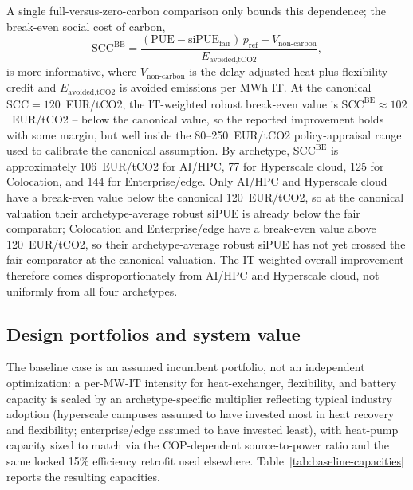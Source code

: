 \documentclass[preprint,12pt]{elsarticle}
\begin{document}
A single full-versus-zero-carbon comparison only bounds this dependence; the break-even social cost of carbon,
\begin{equation}
\text{SCC}^{\text{BE}} = \frac{(\text{PUE} - \text{siPUE}_{\text{fair}})\,p_{\text{ref}} - V_{\text{non-carbon}}}{E_{\text{avoided,tCO2}}},
\label{eq:scc-breakeven}
\end{equation}
is more informative, where $V_{\text{non-carbon}}$ is the delay-adjusted heat-plus-flexibility credit and $E_{\text{avoided,tCO2}}$ is avoided emissions per MWh IT. At the canonical $\text{SCC}=120$~EUR/tCO2, the IT-weighted robust break-even value is $\text{SCC}^{\text{BE}}\approx102$~EUR/tCO2 -- below the canonical value, so the reported improvement holds with some margin, but well inside the 80--250~EUR/tCO2 policy-appraisal range used to calibrate the canonical assumption. By archetype, $\text{SCC}^{\text{BE}}$ is approximately 106~EUR/tCO2 for AI/HPC, 77 for Hyperscale cloud, 125 for Colocation, and 144 for Enterprise/edge. Only AI/HPC and Hyperscale cloud have a break-even value below the canonical 120~EUR/tCO2, so at the canonical valuation their archetype-average robust siPUE is already below the fair comparator; Colocation and Enterprise/edge have a break-even value above 120~EUR/tCO2, so their archetype-average robust siPUE has not yet crossed the fair comparator at the canonical valuation. The IT-weighted overall improvement therefore comes disproportionately from AI/HPC and Hyperscale cloud, not uniformly from all four archetypes.

\subsection{Design portfolios and system value}

The baseline case is an assumed incumbent portfolio, not an independent optimization: a per-MW-IT intensity for heat-exchanger, flexibility, and battery capacity is scaled by an archetype-specific multiplier reflecting typical industry adoption (hyperscale campuses assumed to have invested most in heat recovery and flexibility; enterprise/edge assumed to have invested least), with heat-pump capacity sized to match via the COP-dependent source-to-power ratio and the same locked 15\% efficiency retrofit used elsewhere. Table~\ref{tab:baseline-capacities} reports the resulting capacities.
\end{document}
